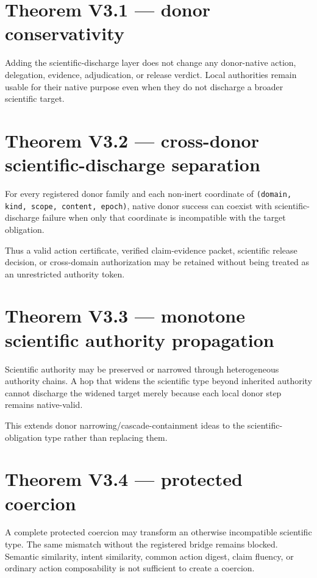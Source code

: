 \section{Theorem V3.1 --- donor conservativity}

Adding the scientific-discharge layer does not change any donor-native action, delegation, evidence, adjudication, or release verdict. Local authorities remain usable for their native purpose even when they do not discharge a broader scientific target.

\section{Theorem V3.2 --- cross-donor scientific-discharge separation}

For every registered donor family and each non-inert coordinate of \texttt{(domain, kind, scope, content, epoch)}, native donor success can coexist with scientific-discharge failure when only that coordinate is incompatible with the target obligation.

Thus a valid action certificate, verified claim-evidence packet, scientific release decision, or cross-domain authorization may be retained without being treated as an unrestricted authority token.

\section{Theorem V3.3 --- monotone scientific authority propagation}

Scientific authority may be preserved or narrowed through heterogeneous authority chains. A hop that widens the scientific type beyond inherited authority cannot discharge the widened target merely because each local donor step remains native-valid.

This extends donor narrowing/cascade-containment ideas to the scientific-obligation type rather than replacing them.

\section{Theorem V3.4 --- protected coercion}

A complete protected coercion may transform an otherwise incompatible scientific type. The same mismatch without the registered bridge remains blocked. Semantic similarity, intent similarity, common action digest, claim fluency, or ordinary action composability is not sufficient to create a coercion.

